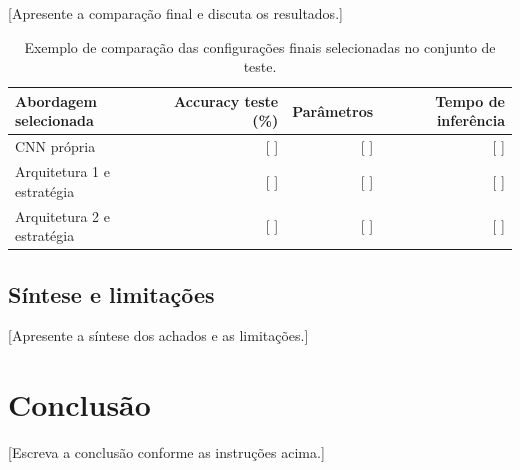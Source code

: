 \documentclass[10pt,a4paper]{article}
\begin{document}
[Apresente a comparação final e discuta os resultados.]

\begin{table}[H]
\centering
\caption{Exemplo de comparação das configurações finais selecionadas no conjunto de teste.}
\label{tab:teste}
\small
\begin{tabular}{lrrr}
\toprule
Abordagem selecionada & Accuracy teste (\%) & Parâmetros & Tempo de inferência\\
\midrule
CNN própria & [ ] & [ ] & [ ]\\
Arquitetura 1 e estratégia & [ ] & [ ] & [ ]\\
Arquitetura 2 e estratégia & [ ] & [ ] & [ ]\\
\bottomrule
\end{tabular}
\end{table}

\subsection{Síntese e limitações}

[Apresente a síntese dos achados e as limitações.]

\section{Conclusão}

[Escreva a conclusão conforme as instruções acima.]

\end{document}
